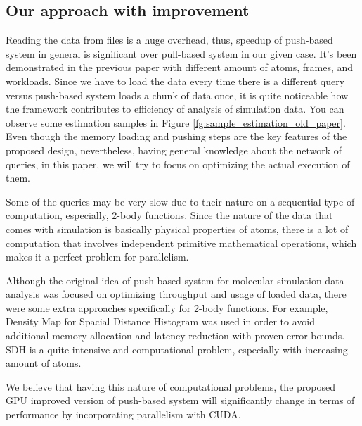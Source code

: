 \documentclass[10pt,journal,final,letterpaper,twocolumn]{IEEEtran}
\begin{document}
\subsection{Our approach with improvement}

Reading the data from files is a huge overhead, thus, speedup of push-based system in general is significant over pull-based system in our given case. 
It's been demonstrated in the previous paper with different amount of atoms, frames, and workloads. Since we have to load the data every time there is a different query versus push-based system loads a chunk of data once, it is quite noticeable how the framework contributes to efficiency of analysis of simulation data. You can observe some estimation samples in Figure \ref{fg:sample_estimation_old_paper}. Even though the memory loading and pushing steps are the key features of the proposed design, nevertheless, having general knowledge about the network of queries, in this paper, we will try to focus on optimizing the actual execution of them.

Some of the queries may be very slow due to their nature on a sequential type of computation,  especially, 2-body functions. Since the nature of the data that comes with simulation is basically physical properties of atoms, there is a lot of computation that involves independent primitive mathematical operations, which makes it a perfect problem for parallelism.

Although the original idea of push-based system for molecular simulation data analysis was focused on optimizing throughput and usage of loaded data, there were some extra approaches specifically for 2-body functions. For example, Density Map for Spacial Distance Histogram was used in order to avoid additional memory allocation and latency reduction with proven error bounds. SDH is a quite intensive and computational problem, especially with increasing amount of atoms. 

We believe that having this nature of computational problems, the proposed GPU improved version of push-based system will significantly change in terms of performance by incorporating parallelism with CUDA.
\end{document}
